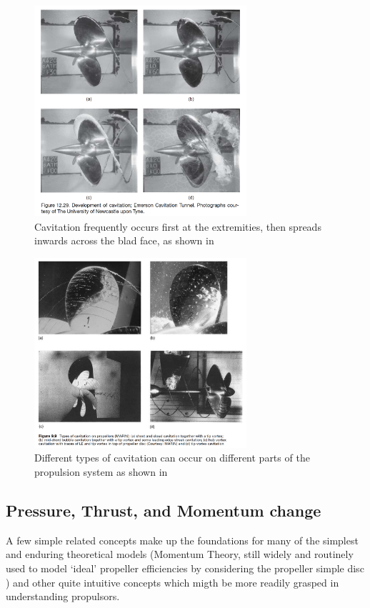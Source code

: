 \documentclass{article}\usepackage[]{graphicx}\usepackage[]{color}
\begin{document}
\begin{appendices}
\begin{figure}[h]
\captionsetup{width=0.7\textwidth}
\includegraphics[width=0.7\textwidth, center]{IncreasingCavitation.png}
\caption{Cavitation frequently occurs first at the extremities, then spreads inwards across the blad face, as shown in \parencite{mollard2011}}
\label{fig:IncreasingCavitation.png}
\end{figure}

\begin{figure}[h]
\captionsetup{width=0.7\textwidth}
\includegraphics[width=0.7\textwidth, center]{CavitationTypes.png}
\caption{Different types of cavitation can occur on different parts of the propulsion system as shown in \parencite{carlton2007}}
\label{fig:CavitationTypes.png}
\end{figure}


\subsection{Pressure, Thrust, and Momentum change}
A few simple related concepts make up the foundations for many of the simplest and enduring theoretical models (Momentum Theory, still widely and routinely used to model `ideal' propeller efficiencies by considering the propeller simple disc \parencite[169]{carlton2007}) and other quite intuitive concepts which migth be more readily grasped in understanding propulsors.


\end{appendices}
\end{document}
